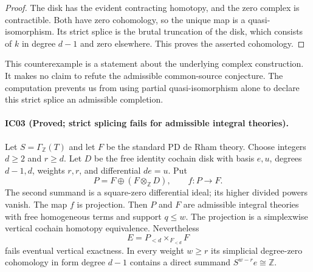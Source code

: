 \begin{proof}
The disk has the evident contracting homotopy, and the zero
complex is contractible. Both have zero cohomology, so the unique
map is a quasi-isomorphism. Its strict splice is the brutal
truncation of the disk, which consists of $k$ in degree $d-1$
and zero elsewhere. This proves the asserted cohomology.
\end{proof}

This counterexample is a statement about the underlying complex
construction. It makes no claim to refute the admissible
common-source conjecture. The computation prevents us from using
partial quasi-isomorphism alone to declare this strict splice an
admissible completion.

\paragraph{IC03 (Proved; strict splicing fails for admissible integral theories).}
Let $S=\Gamma_{\mathbb Z}(T)$ and let $F$ be the standard
PD de Rham theory. Choose integers $d\geq2$ and $r\geq d$.
Let $D$ be the free identity cochain disk with basis $e,u$,
degrees $d-1,d$, weights $r,r$, and differential $de=u$.
Put
\[
 P=F\oplus(F\otimes_{\mathbb Z}D),\qquad f:P\longrightarrow F.
\]
The second summand is a square-zero differential ideal; its
higher divided powers vanish. The map $f$ is projection.
Then $P$ and $F$ are admissible integral theories with free
homogeneous terms and support $q\leq w$. The projection is a
simplexwise vertical cochain homotopy equivalence. Nevertheless
\[
 E=P_{<d}\mathop{\times}_{F_{<d}}F
\]
fails eventual vertical exactness. In every weight $w\geq r$
its simplicial degree-zero cohomology in form degree $d-1$
contains a direct summand $S^{w-r}e\cong\mathbb Z$.

